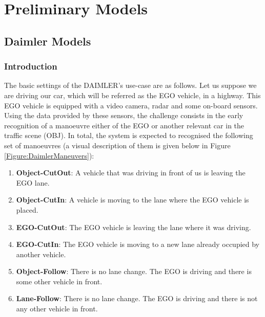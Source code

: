\section{Preliminary Models}
\subsection{Daimler Models}

\subsubsection*{Introduction}

The basic settings of the DAIMLER's use-case \cite{Fer14}	 are as follows. Let us suppose we are driving our car, which will be referred as the EGO vehicle, in a highway. This EGO vehicle is equipped with a video camera, radar and some on-board sensors.  Using the data provided by these sensors, the challenge consists in the early recognition of a manoeuvre either of the EGO or another relevant car in the traffic scene (OBJ). In total, the system is expected to recognised the following set of manoeuvres (a visual description of them is given below in Figure \ref{Figure:DaimlerManeuvers}):
\begin{enumerate}
\item \textbf{Object-CutOut}:  A vehicle that was driving in front of us is leaving the EGO lane.
\item \textbf{Object-CutIn}: A vehicle is moving to the lane where the EGO vehicle is placed.
\item \textbf{EGO-CutOut}: The EGO vehicle is leaving the lane where it was driving.
\item \textbf{EGO-CutIn}: The EGO vehicle is moving to a new lane already occupied by another vehicle. 
\item \textbf{Object-Follow}: There is no lane change. The EGO is driving and there is some other vehicle in front.
\item \textbf{Lane-Follow}: There is no lane change. The EGO is driving and there is not any other vehicle in front.
\end{enumerate}

